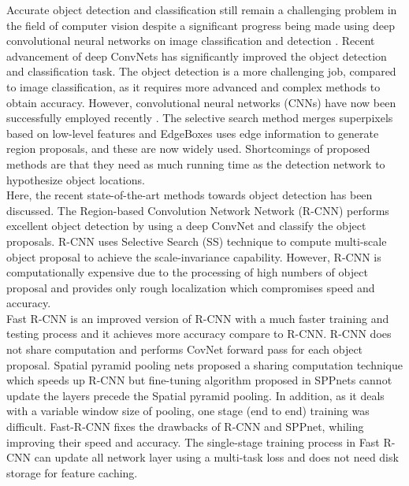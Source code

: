 \documentclass[conference]{IEEEtran}       %
\begin{document}
\indent Accurate object detection and classification still remain a challenging problem in the field of computer vision despite a significant progress being made using deep convolutional neural networks on image classification and detection \cite{ILSVRC15}. Recent advancement of deep ConvNets \cite{PierreICLR14OverFeat} has significantly improved the object detection and classification task. The object detection is a more challenging job, compared to image classification, as it requires more advanced and complex methods \cite{ GirshickCVPR2014-RCNN, PierreICLR14OverFeat} to obtain accuracy.  However, convolutional neural networks (CNNs) have now been successfully employed recently \cite{Uijlings13,edge-boxes}. The selective search \cite{Uijlings13} method merges superpixels based on low-level features and EdgeBoxes \cite{edge-boxes} uses edge information to generate region proposals, and these are now widely used. Shortcomings of proposed methods are that they need as much running time as the detection network to hypothesize object locations.\\
\indent Here, the recent state-of-the-art methods towards object detection \cite{GirshickCVPR2014-RCNN, girshickICCV15fastrcnn, renNIPS15fasterrcnn} has been discussed.  The Region-based Convolution Network Network (R-CNN) \cite{GirshickCVPR2014-RCNN} performs excellent object detection by using a deep ConvNet and classify the object proposals. R-CNN uses Selective Search (SS) technique to compute multi-scale object proposal to achieve the scale-invariance capability.  However, R-CNN is computationally expensive due to the processing of high numbers of object proposal and provides only rough localization which compromises speed and accuracy.\\ 
\indent Fast R-CNN \cite{girshickICCV15fastrcnn} is an improved version of R-CNN with a much faster training and testing process and it achieves more accuracy compare to R-CNN. R-CNN does not share computation and performs CovNet forward pass for each object proposal. Spatial pyramid pooling nets \cite{HeSPM-eccv} proposed a sharing computation technique which speeds up R-CNN but fine-tuning algorithm proposed in SPPnets \cite{HeSPM-eccv} cannot update the layers precede the Spatial pyramid pooling. In addition, as it deals with a variable window size of pooling, one stage (end to end) training was difficult. Fast-R-CNN fixes the drawbacks of R-CNN and SPPnet, whiling improving their speed and accuracy. The single-stage training process in Fast R-CNN can update all network layer using a multi-task loss and does not need disk storage for feature caching. 
\end{document}
